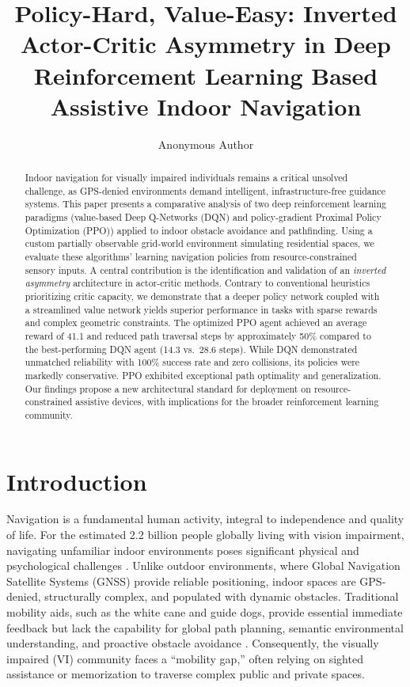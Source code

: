 \documentclass{article}
\title{Policy-Hard, Value-Easy: Inverted Actor-Critic Asymmetry in Deep
Reinforcement Learning Based Assistive Indoor Navigation}
\author{Anonymous Author}
\begin{document}
\maketitle

\begin{abstract}
Indoor navigation for visually impaired individuals remains a critical unsolved
challenge, as GPS-denied environments demand intelligent, infrastructure-free
guidance systems. This paper presents a comparative analysis of two deep
reinforcement learning paradigms (value-based Deep Q-Networks (DQN) and
policy-gradient Proximal Policy Optimization (PPO)) applied to indoor obstacle
avoidance and pathfinding. Using a custom partially observable grid-world
environment simulating residential spaces, we evaluate these algorithms' learning
navigation policies from resource-constrained sensory inputs. A central
contribution is the identification and validation of an \emph{inverted asymmetry}
architecture in actor-critic methods. Contrary to conventional heuristics
prioritizing critic capacity, we demonstrate that a deeper policy network coupled
with a streamlined value network yields superior performance in tasks with sparse
rewards and complex geometric constraints. The optimized PPO agent achieved an
average reward of 41.1 and reduced path traversal steps by approximately 50\%
compared to the best-performing DQN agent (14.3 vs.\ 28.6 steps). While DQN
demonstrated unmatched reliability with 100\% success rate and zero collisions,
its policies were markedly conservative. PPO exhibited exceptional path optimality
and generalization. Our findings propose a new architectural standard for
deployment on resource-constrained assistive devices, with implications for the
broader reinforcement learning community.
\end{abstract}

\section{Introduction}

Navigation is a fundamental human activity, integral to independence and quality
of life. For the estimated 2.2 billion people globally living with vision
impairment, navigating unfamiliar indoor environments poses significant physical
and psychological challenges \cite{feghali2024}. Unlike outdoor environments,
where Global Navigation Satellite Systems (GNSS) provide reliable positioning,
indoor spaces are GPS-denied, structurally complex, and populated with dynamic
obstacles. Traditional mobility aids, such as the white cane and guide dogs,
provide essential immediate feedback but lack the capability for global path
planning, semantic environmental understanding, and proactive obstacle avoidance
\cite{larsen2021}. Consequently, the visually impaired (VI) community faces a
``mobility gap,'' often relying on sighted assistance or memorization to traverse
complex public and private spaces.
\end{document}
